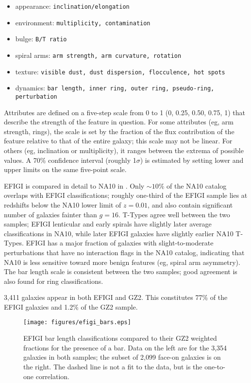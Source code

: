\documentclass[useAMS,usenatbib]{mn2e}
\begin{document}
\begin{itemize}
	\item appearance: {\tt inclination/elongation }
	\item environment: {\tt multiplicity, contamination}
	\item bulge: {\tt B/T ratio}
	\item spiral arms: {\tt arm strength, arm curvature, rotation}
	\item texture: {\tt visible dust, dust dispersion, flocculence, hot spots}
	\item dynamics: {\tt bar length, inner ring, outer ring, pseudo-ring, perturbation}
\end{itemize}

\noindent Attributes are defined on a five-step scale from 0 to 1 (0, 0.25, 0.50, 0.75, 1) that describe the strength of the feature in question. For some attributes (eg, arm strength, rings), the scale is set by the fraction of the flux contribution of the feature relative to that of the entire galaxy; this scale may not be linear. For others (eg, inclination or multiplicity), it ranges between the extrema of possible values. A 70\% confidence interval (roughly 1$\sigma$) is estimated by setting lower and upper limits on the same five-point scale.

EFIGI is compared in detail to NA10 in \citet{bai11}. Only $\sim10\%$ of the NA10 catalog overlaps with EFIGI classifications; roughly one-third of the EFIGI sample lies at redshifts below the NA10 lower limit of $z=0.01$, and also contain significant number of galaxies fainter than $g=16$. T-Types agree well between the two samples; EFIGI lenticular and early spirals have slightly later average classifications in NA10, while later EFIGI galaxies have slightly earlier NA10 T-Types. EFIGI has a major fraction of galaxies with slight-to-moderate perturbations that have no interaction flags in the NA10 catalog, indicating that NA10 is less sensitive toward more benign features (eg, spiral arm asymmetry). The bar length scale is consistent between the two samples; good agreement is also found for ring classifications. 

3,411 galaxies appear in both EFIGI and GZ2. This constitutes 77\% of the EFIGI galaxies and 1.2\% of the GZ2 sample. 

\begin{figure*}
\texttt{[image: figures/efigi\_bars.eps]}
\caption{EFIGI bar length classifications compared to their GZ2 weighted fractions for the presence of a bar. Data on the left are for the 3,354 galaxies in both samples; the subset of 2,099 face-on galaxies is on the right. The dashed line is not a fit to the data, but is the one-to-one correlation. 
\label{fig-efigi_bars}}
\end{figure*}
\end{document}
